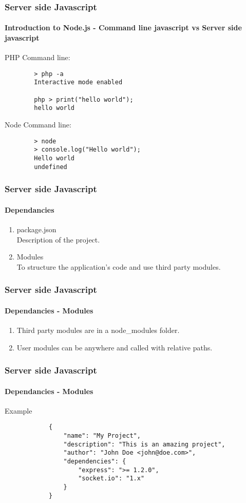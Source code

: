 \documentclass{beamer}
\begin{document}
	\begin{frame}[fragile]
		\frametitle{Server side Javascript}
		\framesubtitle{Introduction to Node.js - Command line javascript vs Server side javascript}

		PHP Command line:
		\begin{verbatim}
		> php -a
		Interactive mode enabled

		php > print("hello world");
		hello world
		\end{verbatim}

		Node Command line:
		\begin{verbatim}
		> node
		> console.log("Hello world");
		Hello world
		undefined
		\end{verbatim}
	\end{frame}


	\begin{frame}
		\frametitle{Server side Javascript}
		\framesubtitle{Dependancies}
		\begin{enumerate}
			\item package.json \\
				Description of the project.
			\item Modules \\
				To structure the application's code and use third party modules.
		\end{enumerate}
	\end{frame}

	\begin{frame}
		\frametitle{Server side Javascript}
		\framesubtitle{Dependancies - Modules}

		\begin{enumerate}
			\item Third party modules are in a node\_modules folder.
			\item User modules can be anywhere and called with relative paths.
		\end{enumerate}
	\end{frame}

	\begin{frame}[fragile]
		\frametitle{Server side Javascript}
		\framesubtitle{Dependancies - Modules}
		Example
		\begin{verbatim}
			{
				"name": "My Project",
				"description": "This is an amazing project",
				"author": "John Doe <john@doe.com>",
				"dependencies": {
					"express": ">= 1.2.0",
					"socket.io": "1.x"
				}
			}
		\end{verbatim}
	\end{frame}
\end{document}
